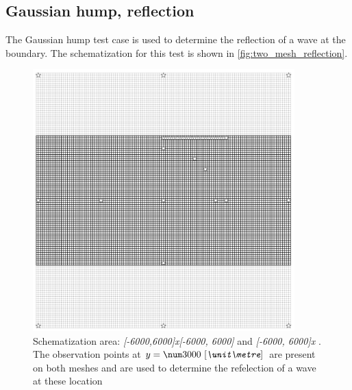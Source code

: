 \subsection{Gaussian hump, reflection}\label{sec:gaussian_hump_refelction}
The Gaussian hump test case is used to determine the reflection of a wave at the boundary. The schematization for this test is shown in \autoref{fig:two_mesh_reflection}.
\begin{figure}[H]
    \centering
    \includegraphics[width=0.9\textwidth]{figures/two_meshes_for_reflection.png}
    \caption{Schematization area: \emph{[-6000,6000]x[-6000, 6000]}  and \emph{[-6000, 6000]x\newline [-3000, 3000]} \bunit{\metre}. The observation points at $y=\bqty{3000}{\metre}$ are present on both meshes and are used to determine the refelection of a wave at these location}\label{fig:two_mesh_reflection}
\end{figure}

\notyet